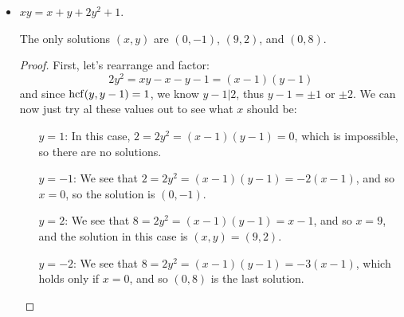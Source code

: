 \documentclass[11pt,dvipsnames]{book}
\def\hcf{{\rm hcf}}
\numberwithin{equation}{section} %
\numberwithin{figure}{section} %
\numberwithin{table}{section} %
\begin{document}
\begin{exercise}
\begin{itemize}
\begin{solution}
\begin{proof}
\begin{itemize}[(a)]
\item $x-y=1$. Then we have that $x=y+1$, and so
\[
7=x^3-y^3= (y+1)^3-y^3 = 3y^2+3y+1,\]
thus $6=3y^2+y$, so $2=y^2+y=y(y+1)$, so we see that $y|2$ and $y+1|2$. The only way this is possible is if either $y=1$ or $y=-2$. By plugging these values into the original equation, we see that the solutions are in this case $(x,y)=(2,1)$ and $(-1,-2)$.
\item Suppose $x-y=7$. Then
\[
7=(x-y)(x^2+xy+y^2)=7(x^2+xy+y^2)
\]
implies
\[
1=(x^2+xy+y^2).
\]
Note that if $|x|\geq |y|$, then $xy\geq -|x|\cdot |y|\geq -|x|^2=-x^2$, and so the above is at least
\[
1\geq x^2-x^2=y^2>0\]
since we are assuming $y\neq 0$. Hence, $y^2=1$, so $y=\pm 1$. Again, we can plug these into our original equation $7=x^3-y^3$ and we find that $y=-1$ leads to no solution and $y=1$ leads to $(x,y)=(2,1)$, which we already found.

Thus, the solutions are just $(x,y)=(2,1)$ and $(-1,-2)$.
\end{itemize}


\end{proof}


\end{solution}

\item $xy= x+y+2y^2+1$.

\begin{solution}

\begin{claim}
The only solutions $(x,y)$ are $(0,-1)$, $(9,2)$, and  $(0,8)$.
\end{claim}

\begin{proof}


First, let's rearrange and factor:
\[
2y^2=xy-x-y-1 = (x-1)(y-1)
\]
and since $\hcf(y,y-1)=1$, we know $y-1|2$, thus $y-1=\pm 1$ or $\pm 2$. We can now just try al these values out to see what $x$ should be:
\begin{itemize}
\item[$y=1$:] In this case, $2=2y^2=(x-1)(y-1)=0$, which is impossible, so there are no solutions.
\item[$y=-1$:] We see that $2=2y^2=(x-1)(y-1)=-2(x-1)$, and so $x=0$, so the solution is $(0,-1)$.
\item[$y=2$:] We see that $8=2y^2 = (x-1)(y-1)=x-1$, and so $x=9$, and the solution in this case is $(x,y)=(9,2)$. 
\item[$y=-2$:] We see that $8=2y^2=(x-1)(y-1)=-3(x-1)$, which holds only if $x=0$, and so $(0,8)$ is the last solution. 
\end{itemize}
\end{proof}
\end{solution}



\end{itemize}
\end{exercise}
\end{document}
